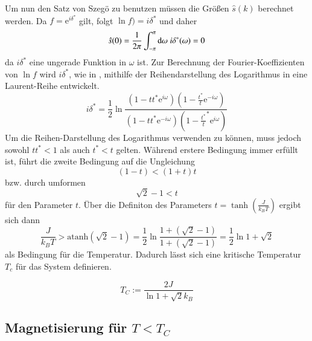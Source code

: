 Um nun den Satz von Szegö zu benutzen müssen die Größen  $\hat{s}(k)$ berechnet werden.
Da $f = \mathrm{e}^{i\delta^*}$ gilt, folgt $\ln{f)} = i \delta^*$ und daher
\begin{equation}
\hat{s}(0) = \frac{1}{2\pi} \int_{-\pi}^{\pi} \mathrm{d}\omega\; i \delta^*(\omega)  = 0
\end{equation}
da $i \delta^*$ eine ungerade Funktion in $\omega$ ist. Zur Berechnung der Fourier-Koeffizienten von $\ln{f}$ wird $i\delta^*$,  wie in \cite{Montroll_Potts_Ward}, mithilfe der Reihendarstellung des Logarithmus in eine Laurent-Reihe entwickelt.
\begin{equation} \label{eq: idelta = frac} 
i\delta^* = \frac{1}{2} \ln{\frac{(1-tt^*\mathrm{e}^{i\omega})(1-\frac{t^*}{t}\mathrm{e}^{-i\omega})}{(1-tt^*\mathrm{e}^{-i\omega})(1-\frac{t^*}{t}^*\mathrm{e}^{i\omega})}}
\end{equation}
Um die Reihen-Darstellung des Logarithmus verwenden zu können, muss jedoch sowohl $tt^* < 1$ als auch $t^* < t $ gelten. Während erstere Bedingung immer erfüllt ist, führt die zweite Bedingung auf die Ungleichung
\begin{equation}
(1-t) < (1+t)t  
\end{equation}
bzw. durch umformen
\begin{equation}
\sqrt{2}-1 < t
\end{equation}
für den Parameter $t$. Über die Definiton des Parameters $t = \tanh(\frac{J}{k_B T})$ ergibt sich dann 
\begin{equation} \label{eq: umformun condition krit temp}
\frac{J}{k_B T} > \mathrm{atanh}\left(\sqrt{2}-1\right) = \frac{1}{2} \ln{\frac{1+(\sqrt{2}-1)}{1+(\sqrt{2}-1)}} = \frac{1}{2} \ln{1+\sqrt{2}}
\end{equation}
als Bedingung für die Temperatur. Dadurch lässt sich eine kritische Temperatur $T_c$ für das System definieren.
\begin{grayframe}[frametitle = {Kritische Temperatur $T_C$}]
\begin{equation}
T_C  := \frac{2 J}{ \ln{1+\sqrt{2}} k_B}
\end{equation}
\end{grayframe}

\subsection{Magnetisierung für $T < T_C$}

